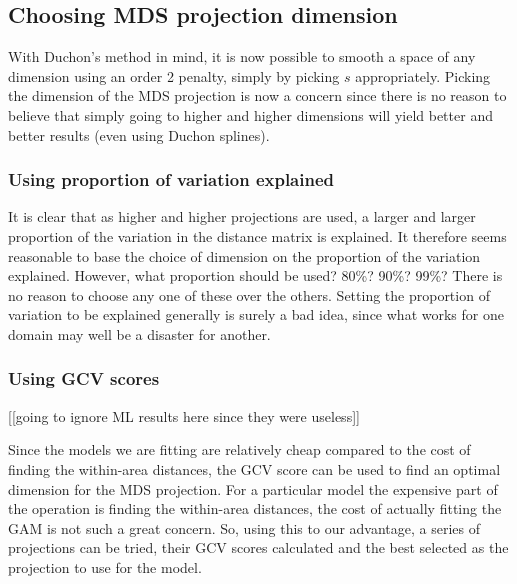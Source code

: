 {%

\subsection{Choosing MDS projection dimension}

With Duchon's method in mind, it is now possible to smooth a space of any dimension using an order 2 penalty, simply by picking $s$ appropriately. Picking the dimension of the MDS projection is now a concern since there is no reason to believe that simply going to higher and higher dimensions will yield better and better results (even using Duchon splines).

\subsubsection{Using proportion of variation explained}

It is clear that as higher and higher projections are used, a larger and larger proportion of the variation in the distance matrix is explained. It therefore seems reasonable to base the choice of dimension on the proportion of the variation explained. However, what proportion should be used? 80\%? 90\%? 99\%? There is no reason to choose any one of these over the others. Setting the proportion of variation to be explained generally is surely a bad idea, since what works for one domain may well be a disaster for another.


\subsubsection{Using GCV scores}

[[going to ignore ML results here since they were useless]]

Since the models we are fitting are relatively cheap compared to the cost of finding the within-area distances, the GCV score can be used to find an optimal dimension for the MDS projection. For a particular model the expensive part of the operation is finding the within-area distances, the cost of actually fitting the GAM is not such a great concern. So, using this to our advantage, a series of projections can be tried, their GCV scores calculated and the best selected as the projection to use for the model.

}
